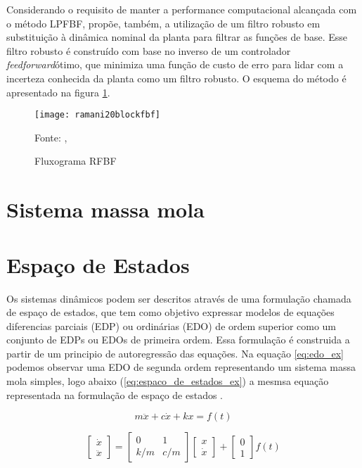 Considerando o requisito de manter a performance computacional alcançada com o método LPFBF, \cite{ramani20} 
propõe, também, a utilização de um filtro robusto em substituição à dinâmica nominal da planta para 
filtrar as funções de base. Esse filtro robusto é construído com base no inverso de um controlador 
\textit{feedforward}ótimo, que minimiza uma função de custo de erro para lidar com a incerteza conhecida da planta 
como um filtro robusto.
O esquema do método é apresentado na figura \ref{fig:flowchart_rfbf}.

\begin{figure}[!htb]
    \centering
    \caption{Fluxograma RFBF}
    \texttt{[image: ramani20blockfbf]}

    {\footnotesize Fonte: \citeauthor{ramani20}, \citeyear{ramani20}}
    \label{fig:flowchart_rfbf}
\end{figure}

\section{Sistema massa mola}

\section{Espaço de Estados}

Os sistemas dinâmicos podem ser descritos através de uma formulação
chamada de espaço de estados, que tem como objetivo expressar modelos 
de equações diferencias parciais (EDP) ou ordinárias (EDO) de ordem superior
como um conjunto de EDPs ou EDOs de primeira ordem.
Essa formulação é construida a partir de um principio de autoregressão
das equações. Na equação \ref{eq:edo_ex} podemos observar uma EDO de segunda ordem representando
um sistema massa mola simples,
logo abaixo (\ref{eq:espaco_de_estados_ex}) a mesmsa equação representada na formulação
de espaço de estados \cite{hamilton94}.

\begin{equation}
    \label{eq:edo_ex}
    m \ddot x+c \dot x+kx = f(t)
\end{equation}

\begin{equation}
    \label{eq:espaco_de_estados_ex}
    \begin{bmatrix}
        \dot x \\
        \ddot x
    \end{bmatrix}
    =
    \begin{bmatrix}
        0 & 1 \\
        k/m & c/m
    \end{bmatrix}
    \begin{bmatrix}
        x \\
        \dot x
    \end{bmatrix}
    +
    \begin{bmatrix}
        0 \\
        1
    \end{bmatrix}
    f(t)
\end{equation}

